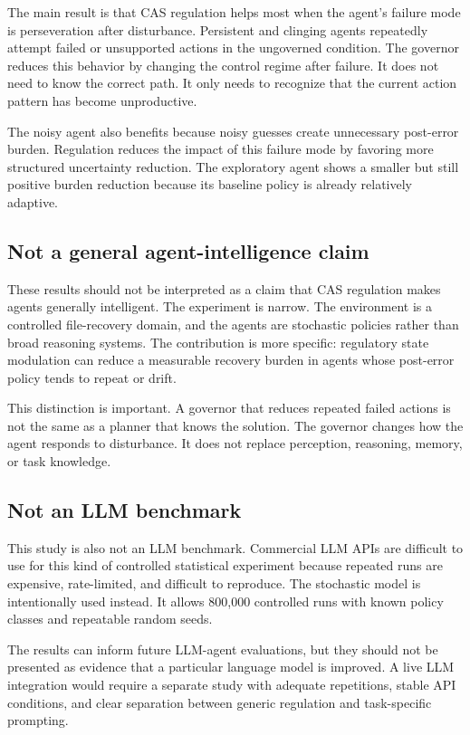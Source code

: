 \documentclass[11pt]{article}
\begin{document}
The main result is that CAS regulation helps most when the agent's failure mode is perseveration after disturbance. Persistent and clinging agents repeatedly attempt failed or unsupported actions in the ungoverned condition. The governor reduces this behavior by changing the control regime after failure. It does not need to know the correct path. It only needs to recognize that the current action pattern has become unproductive.

The noisy agent also benefits because noisy guesses create unnecessary post-error burden. Regulation reduces the impact of this failure mode by favoring more structured uncertainty reduction. The exploratory agent shows a smaller but still positive burden reduction because its baseline policy is already relatively adaptive.

\subsection{Not a general agent-intelligence claim}

These results should not be interpreted as a claim that CAS regulation makes agents generally intelligent. The experiment is narrow. The environment is a controlled file-recovery domain, and the agents are stochastic policies rather than broad reasoning systems. The contribution is more specific: regulatory state modulation can reduce a measurable recovery burden in agents whose post-error policy tends to repeat or drift.

This distinction is important. A governor that reduces repeated failed actions is not the same as a planner that knows the solution. The governor changes how the agent responds to disturbance. It does not replace perception, reasoning, memory, or task knowledge.

\subsection{Not an LLM benchmark}

This study is also not an LLM benchmark. Commercial LLM APIs are difficult to use for this kind of controlled statistical experiment because repeated runs are expensive, rate-limited, and difficult to reproduce. The stochastic model is intentionally used instead. It allows 800,000 controlled runs with known policy classes and repeatable random seeds.

The results can inform future LLM-agent evaluations, but they should not be presented as evidence that a particular language model is improved. A live LLM integration would require a separate study with adequate repetitions, stable API conditions, and clear separation between generic regulation and task-specific prompting.
\end{document}
